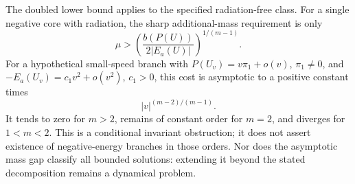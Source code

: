 The doubled lower bound applies to the specified radiation-free class. For a single negative core with radiation, the sharp additional-mass requirement is only
\[
 \mu>\left(\frac{b(P(U))}{2|E_a(U)|}\right)^{1/(m-1)}.
\]
For a hypothetical small-speed branch with
$P(U_v)=v\pi_1+o(v)$, $\pi_1\ne0$, and
$-E_a(U_v)=c_1v^2+o(v^2)$, $c_1>0$, this cost is asymptotic to a positive constant times
\[
 |v|^{(m-2)/(m-1)}.
\]
It tends to zero for $m>2$, remains of constant order for $m=2$, and diverges for $1<m<2$. This is a conditional invariant obstruction; it does not assert existence of negative-energy branches in those orders. Nor does the asymptotic mass gap classify all bounded solutions: extending it beyond the stated decomposition remains a dynamical problem.
